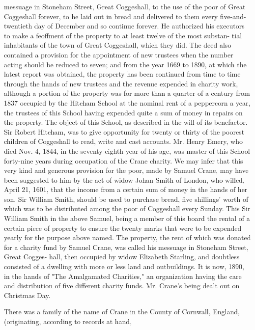 \documentclass{book}
\begin{document}
messuage in Stoneham Street, Great Coggeshall, to the use of the 
poor of Great Coggeshall forever, to he laid out in bread and 
delivered to them every five-and-twentieth day of December and 
so continue forever. He authorized his executors to make a 
feoffment of the property to at least twelve of the most substan- 
tial inhabitants of the town of Great Coggeshall, which they did. 
The deed also contained a provision for the appointment of new 
trustees when the number acting should be reduced to seven; 
and from the year 1669 to 1890, at which the latest report was 
obtained, the property has been continued from time to time 
through the hands of new trustees and the revenue expended in 
charity work, although a portion of the property was for more 
than a quarter of a century from 1837 occupied by the Hitcham 
School at the nominal rent of a peppercorn a year, the trustees of 
this School having expended quite a sum of money in repairs on 
the property. The object of this School, as described in the will 
of its benefactor. Sir Robert Hitcham, was to give opportunity 
for twenty or thirty of the poorest children of Coggeshall to read, 
write and cast accounts. Mr. Henry Emery, who died Nov. 4, 
1844, in the seventy-eighth year of his age, was master of this 
School forty-nine years during occupation of the Crane charity. 
We may infer that this very kind and generous provision for the 
poor, made by Samuel Crane, may have been suggested to him 
by the act of widow Johan Smith of London, who willed, April 
21, 1601, that the income from a certain sum of money in the 
hands of her son. Sir William Smith, should be used to purchase 
bread, five shillings' worth of which was to be distributed among 
the poor of Coggeshall every Sunday. This Sir William Smith in 
the above Samuel, being a member of this board  the rental of a 
certain piece of property to ensure the twenty marks that were to 
be expended yearly for the purpose above named. The property, 
the rent of which was donated for a charity fund by Samuel 
Crane, was called his messuage in Stoneham Street, Great Cogges- 
hall, then occupied by widow Elizabeth Starling, and doubtless 
consisted of a dwelling with more or less land and outbuildings. 
It is now, 1890, in the hands of "The Amalgamated Charities," 
an organization having the care and distribution of five different 
charity funds. Mr. Crane's being dealt out on Christmas Day. 

There was a family of the name of Crane in the County of 
Cornwall, England, (originating, according to records at hand, 
\end{document}
